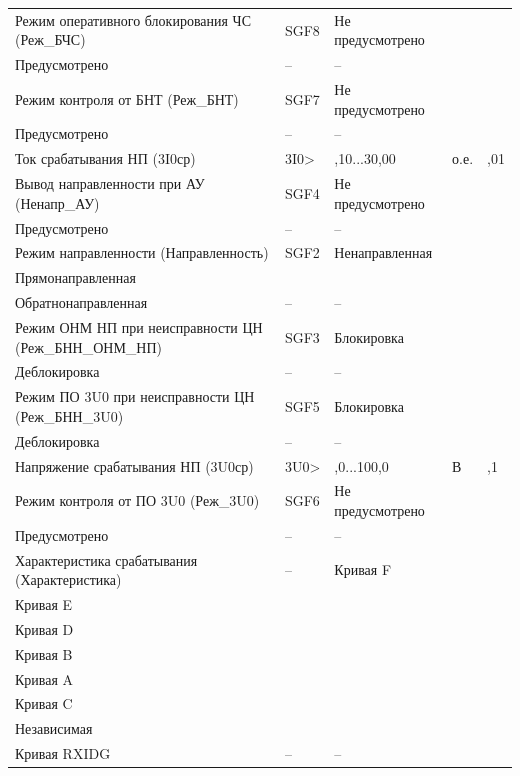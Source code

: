 \begin{longtable}{|>{\centering\arraybackslash}m{5.3cm}|>{\centering\arraybackslash}m{3.3cm}|>{\centering\arraybackslash}m{4.2cm}|>{\centering\arraybackslash}m{1.8cm}|>{\centering\arraybackslash}m{1cm}|}
\hline
\centering Режим оперативного блокирования ЧС (Реж\_БЧС)  & \centering SGF8 & \centering Не предусмотрено \\ Предусмотрено & \centering -- & \centering \arraybackslash -- \\
\hline
\centering Режим контроля от БНТ (Реж\_БНТ)  & \centering SGF7 & \centering Не предусмотрено \\ Предусмотрено & \centering -- & \centering \arraybackslash -- \\
\hline
\centering Ток срабатывания НП (3I0ср)  & \centering 3I0> & \centering 0,10...30,00 & \centering о.е. & \centering \arraybackslash 0,01 \\
\hline
\centering Вывод направленности при АУ (Ненапр\_АУ)  & \centering SGF4 & \centering Не предусмотрено \\ Предусмотрено & \centering -- & \centering \arraybackslash -- \\
\hline
\centering Режим направленности (Направленность)  & \centering SGF2 & \centering Ненаправленная \\ Прямонаправленная \\ Обратнонаправленная & \centering -- & \centering \arraybackslash -- \\
\hline
\centering Режим ОНМ НП при неисправности ЦН (Реж\_БНН\_ОНМ\_НП)  & \centering SGF3 & \centering Блокировка \\ Деблокировка & \centering -- & \centering \arraybackslash -- \\
\hline
\centering Режим ПО 3U0 при неисправности ЦН (Реж\_БНН\_3U0)  & \centering SGF5 & \centering Блокировка \\ Деблокировка & \centering -- & \centering \arraybackslash -- \\
\hline
\centering Напряжение срабатывания НП (3U0ср)  & \centering 3U0> & \centering 2,0...100,0 & \centering В & \centering \arraybackslash 0,1 \\
\hline
\centering Режим контроля от ПО 3U0 (Реж\_3U0)  & \centering SGF6 & \centering Не предусмотрено \\ Предусмотрено & \centering -- & \centering \arraybackslash -- \\
\hline
\centering Характеристика срабатывания (Характеристика)  & \centering -- & \centering Кривая F \\ Кривая E \\ Кривая D \\ Кривая B \\ Кривая A \\ Кривая C \\ Независимая \\ Кривая RXIDG & \centering -- & \centering \arraybackslash -- \\

\end{longtable}
